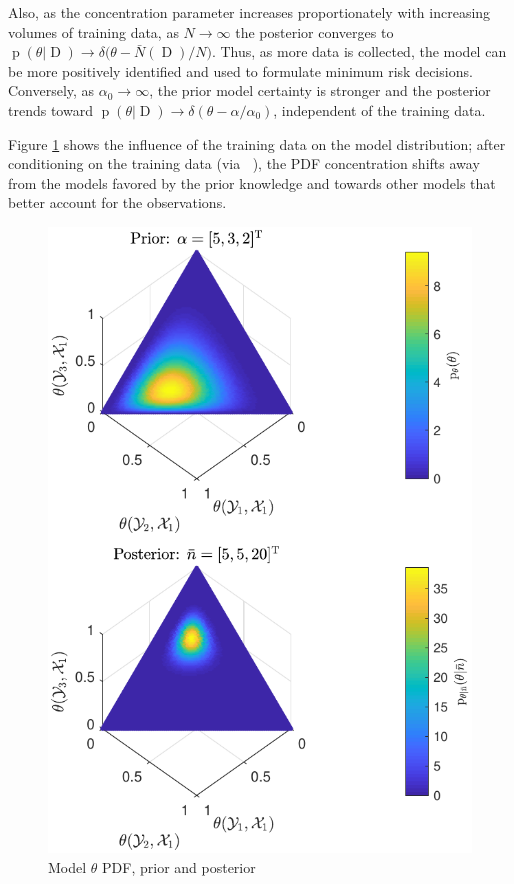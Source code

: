 \documentclass[12pt]{report}
\DeclareMathOperator{\Drm}{\mathrm{D}}
\DeclareMathOperator{\nbarrm}{\bar{\mathrm{n}}}
\DeclareMathOperator{\prm}{\mathrm{p}}
\begin{document}
Also, as the concentration parameter increases proportionately with increasing volumes of training data, as $N \to \infty$ the posterior converges to $\prm(\theta | \Drm) \to \delta\big( \theta - \bar{N}(\Drm) / N \big)$. Thus, as more data is collected, the model can be more positively identified and used to formulate minimum risk decisions. Conversely, as $\alpha_0 \to \infty$, the prior model certainty is stronger and the posterior trends toward $\prm(\theta | \Drm) \to \delta( \theta - \alpha / \alpha_0)$, independent of the training data.

Figure \ref{fig:P_theta_D} shows the influence of the training data on the model distribution; after conditioning on the training data (via $\nbarrm$), the PDF concentration shifts away from the models favored by the prior knowledge and towards other models that better account for the observations.

\begin{figure}
\centering
\includegraphics[scale=1.0]{P_theta_post.pdf}
\caption{Model $\theta$ PDF, prior and posterior}
\label{fig:P_theta_D}
\end{figure}
\end{document}
